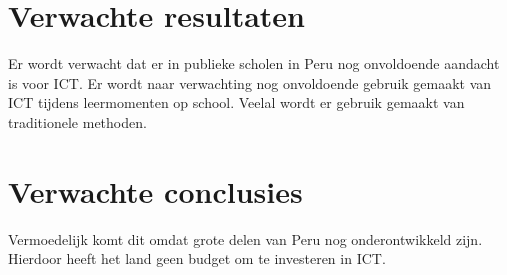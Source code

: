 
\section{Verwachte resultaten}
\label{sec:verwachte_resultaten}
Er wordt verwacht dat er in publieke scholen in Peru nog onvoldoende aandacht is voor ICT. Er wordt naar verwachting nog onvoldoende gebruik gemaakt van ICT tijdens leermomenten op school. Veelal wordt er gebruik gemaakt van traditionele methoden.

\section{Verwachte conclusies}
\label{sec:verwachte_conclusies}
Vermoedelijk komt dit omdat grote delen van Peru nog onderontwikkeld zijn. Hierdoor heeft het land geen budget om te investeren in ICT.

